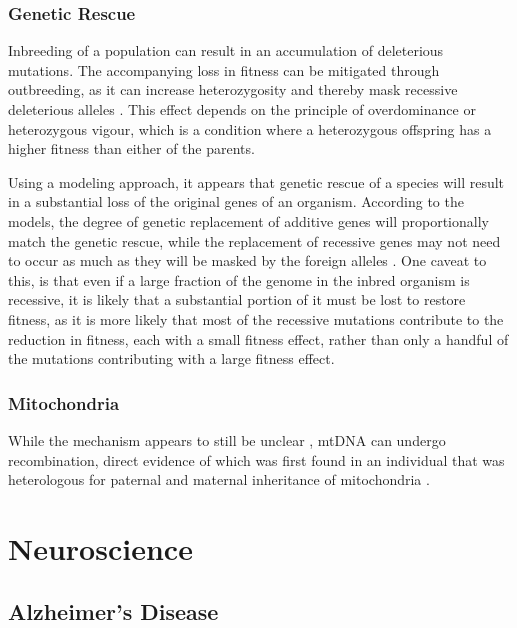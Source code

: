 \documentclass[]{book}
\begin{document}
\subsection{Genetic Rescue}\label{genetic-rescue}

Inbreeding of a population can result in an accumulation of deleterious
mutations. The accompanying loss in fitness can be mitigated through
outbreeding, as it can increase heterozygosity and thereby mask
recessive deleterious alleles
\citep{keller2002inbreeding, ingvarsson2001restoration, vila2003rescue}.
This effect depends on the principle of overdominance or heterozygous
vigour, which is a condition where a heterozygous offspring has a higher
fitness than either of the parents.

Using a modeling approach, it appears that genetic rescue of a species
will result in a substantial loss of the original genes of an organism.
According to the models, the degree of genetic replacement of additive
genes will proportionally match the genetic rescue, while the
replacement of recessive genes may not need to occur as much as they
will be masked by the foreign alleles \citep{Harris2019-sm}. One caveat
to this, is that even if a large fraction of the genome in the inbred
organism is recessive, it is likely that a substantial portion of it
must be lost to restore fitness, as it is more likely that most of the
recessive mutations contribute to the reduction in fitness, each with a
small fitness effect, rather than only a handful of the mutations
contributing with a large fitness effect.

\subsection{Mitochondria}\label{mitochondria}

While the mechanism appears to still be unclear
\citep{chen2013mechanism}, mtDNA can undergo recombination, direct
evidence of which was first found in an individual that was heterologous
for paternal and maternal inheritance of mitochondria
\citep{kraytsberg2004recombination}.

\chapter{Neuroscience}\label{neurosci}

\section{Alzheimer's Disease}\label{alzheimers-disease}
\end{document}
